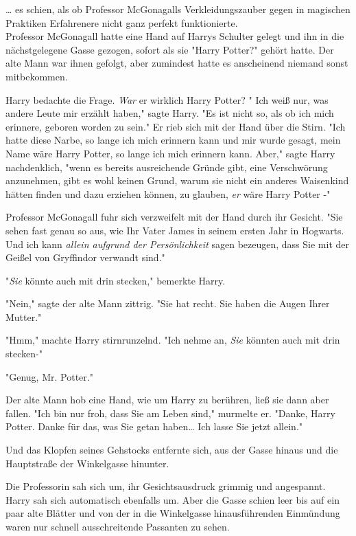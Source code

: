 {… es schien, als ob Professor McGonagalls Verkleidungszauber gegen in magischen Praktiken Erfahrenere nicht ganz perfekt funktionierte.\\ Professor McGonagall hatte eine Hand auf Harrys Schulter gelegt und ihn in die nächstgelegene Gasse gezogen, sofort als sie "Harry Potter?" gehört hatte. Der alte Mann war ihnen gefolgt, aber zumindest hatte es anscheinend niemand sonst mitbekommen.

Harry bedachte die Frage. \emph{War} er wirklich Harry Potter? " Ich weiß nur, was andere Leute mir erzählt haben," sagte Harry. "Es ist nicht so, als ob ich mich erinnere, geboren worden zu sein." Er rieb sich mit der Hand über die Stirn. "Ich hatte diese Narbe, so lange ich mich erinnern kann und mir wurde gesagt, mein Name wäre Harry Potter, so lange ich mich erinnern kann. Aber," sagte Harry nachdenklich, "wenn es bereits ausreichende Gründe gibt, eine Verschwörung anzunehmen, gibt es wohl keinen Grund, warum sie nicht ein anderes Waisenkind hätten finden und dazu erziehen können, zu glauben, \emph{er} wäre Harry Potter -"

Professor McGonagall fuhr sich verzweifelt mit der Hand durch ihr Gesicht. "Sie sehen fast genau so aus, wie Ihr Vater James in seinem ersten Jahr in Hogwarts. Und ich kann \emph{allein aufgrund der Persönlichkeit} sagen bezeugen, dass Sie mit der Geißel von Gryffindor verwandt sind."

"\emph{Sie} könnte auch mit drin stecken," bemerkte Harry.

"Nein," sagte der alte Mann zittrig. "Sie hat recht. Sie haben die Augen Ihrer Mutter."

"Hmm," machte Harry stirnrunzelnd. "Ich nehme an, \emph{Sie} könnten auch mit drin stecken-"

"Genug, Mr. Potter."

Der alte Mann hob eine Hand, wie um Harry zu berühren, ließ sie dann aber fallen. "Ich bin nur froh, dass Sie am Leben sind," murmelte er. "Danke, Harry Potter. Danke für das, was Sie getan haben… Ich lasse Sie jetzt allein."

Und das Klopfen seines Gehstocks entfernte sich, aus der Gasse hinaus und die Hauptstraße der Winkelgasse hinunter.

Die Professorin sah sich um, ihr Gesichtsausdruck grimmig und angespannt. Harry sah sich automatisch ebenfalls um. Aber die Gasse schien leer bis auf ein paar alte Blätter und von der in die Winkelgasse hinausführenden Einmündung waren nur schnell ausschreitende Passanten zu sehen.

}
